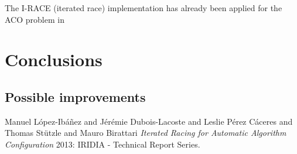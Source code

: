 \documentclass[12pt]{article}
\begin{document}
The I-RACE (iterated race) implementation has already been applied for the ACO problem in \cite{iraceaac}

\section{Conclusions}

\subsection{Possible improvements}


\begin{thebibliography}{1}


   Manuel L{\'o}pez-Ib{\'a}{\~n}ez  and  J{\'e}r{\'e}mie Dubois-Lacoste  and Leslie {P{\'e}rez C{\'a}ceres}  and  Thomas St{\"u}tzle  and  Mauro Birattari {\em Iterated Racing for Automatic Algorithm Configuration} 2013: IRIDIA - Technical Report Series.


\end{thebibliography}
\end{document}
